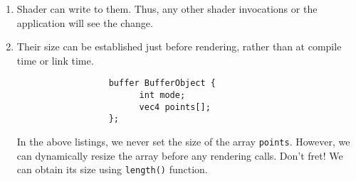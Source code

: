 \documentclass[a4paper, 12pt]{article}
\begin{document}
\begin{enumerate}
      \item
            Shader can write to them.
            Thus, any other shader invocations or the application will see the change.
      \item
            Their size can be established just before rendering, rather than at compile time or link time.

            \begin{lstlisting}
                  buffer BufferObject {
                        int mode;
                        vec4 points[];
                  };
            \end{lstlisting}

            In the above listings, we never set the size of the array \verb|points|.
            However, we can dynamically resize the array before any rendering calls.
            Don't fret!
            We can obtain its size using \verb|length()| function.

\end{enumerate}
\end{document}
